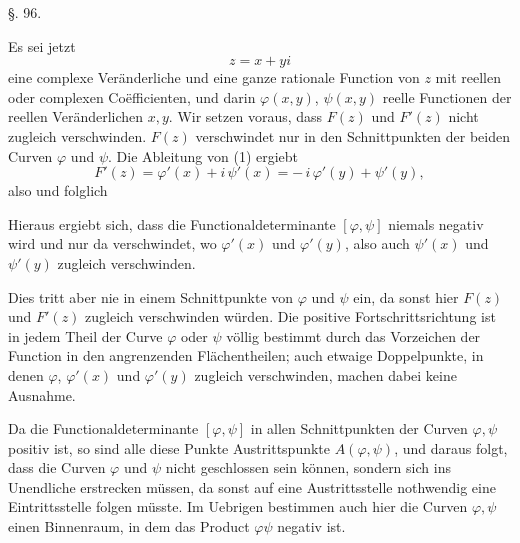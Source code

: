 \begin{center}
§. 96.

\end{center}

Es sei jetzt
\[
z = x + y i
\]
eine complexe Veränderliche und
eine ganze rationale Function von $z$ mit reellen oder complexen Coëfficienten, und darin $\varphi(x,y)$, $\psi(x,y)$ reelle Functionen der reellen Veränderlichen $x, y$. Wir setzen voraus, dass $F(z)$ und $F'(z)$ nicht zugleich verschwinden. $F(z)$ verschwindet nur in den Schnittpunkten der beiden Curven $\varphi$ und $\psi$. Die Ableitung von (1) ergiebt
\[
F'(z) = \varphi'(x) + i\,\psi'(x) = -\,i\,\varphi'(y) + \psi'(y),
\]
also
und folglich

Hieraus ergiebt sich, dass die Functionaldeterminante $[\varphi,\psi]$ niemals negativ wird und nur da verschwindet, wo $\varphi'(x)$ und $\varphi'(y)$, also auch $\psi'(x)$ und $\psi'(y)$ zugleich verschwinden.

Dies tritt aber nie in einem Schnittpunkte von $\varphi$ und $\psi$ ein, da sonst hier $F(z)$ und $F'(z)$ zugleich verschwinden würden. Die positive Fortschrittsrichtung ist in jedem Theil der Curve $\varphi$ oder $\psi$ völlig bestimmt durch das Vorzeichen der Function in den angrenzenden Flächentheilen; auch etwaige Doppelpunkte, in denen $\varphi$, $\varphi'(x)$ und $\varphi'(y)$ zugleich verschwinden, machen dabei keine Ausnahme.

Da die Functionaldeterminante $[\varphi,\psi]$ in allen Schnittpunkten der Curven $\varphi, \psi$ positiv ist, so sind alle diese Punkte Austrittspunkte $A(\varphi,\psi)$, und daraus folgt, dass die Curven $\varphi$ und $\psi$ nicht geschlossen sein können, sondern sich ins Unendliche erstrecken müssen, da sonst auf eine Austrittsstelle nothwendig eine Eintrittsstelle folgen müsste. Im Uebrigen bestimmen auch hier die Curven $\varphi, \psi$ einen Binnenraum, in dem das Product $\varphi\psi$ negativ ist.
